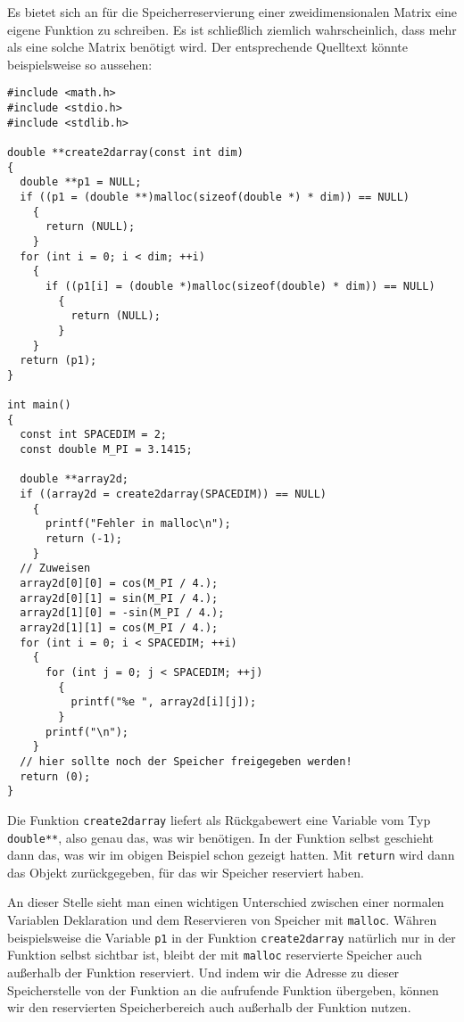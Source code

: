 Es bietet sich an für die Speicherreservierung einer zweidimensionalen Matrix eine eigene Funktion zu schreiben.
Es ist schließlich ziemlich wahrscheinlich, dass mehr als eine solche Matrix benötigt wird.
Der entsprechende Quelltext könnte beispielsweise so aussehen:
\begin{lstlisting}
#include <math.h>
#include <stdio.h>
#include <stdlib.h>

double **create2darray(const int dim)
{
  double **p1 = NULL;
  if ((p1 = (double **)malloc(sizeof(double *) * dim)) == NULL)
    {
      return (NULL);
    }
  for (int i = 0; i < dim; ++i)
    {
      if ((p1[i] = (double *)malloc(sizeof(double) * dim)) == NULL)
        {
          return (NULL);
        }
    }
  return (p1);
}

int main()
{
  const int SPACEDIM = 2;
  const double M_PI = 3.1415;

  double **array2d;
  if ((array2d = create2darray(SPACEDIM)) == NULL)
    {
      printf("Fehler in malloc\n");
      return (-1);
    }
  // Zuweisen
  array2d[0][0] = cos(M_PI / 4.);
  array2d[0][1] = sin(M_PI / 4.);
  array2d[1][0] = -sin(M_PI / 4.);
  array2d[1][1] = cos(M_PI / 4.);
  for (int i = 0; i < SPACEDIM; ++i)
    {
      for (int j = 0; j < SPACEDIM; ++j)
        {
          printf("%e ", array2d[i][j]);
        }
      printf("\n");
    }
  // hier sollte noch der Speicher freigegeben werden!
  return (0);
}
\end{lstlisting}
Die Funktion \verb|create2darray| liefert als Rückgabewert eine Variable vom Typ \verb|double**|, also genau das, was wir benötigen.
In der Funktion selbst geschieht dann das, was wir im obigen Beispiel schon gezeigt hatten.
Mit \verb|return| wird dann das Objekt zurückgegeben, für das wir Speicher reserviert haben.

An dieser Stelle sieht man einen wichtigen Unterschied zwischen einer normalen Variablen Deklaration und dem Reservieren von Speicher mit \verb|malloc|.
Währen beispielsweise die Variable \verb|p1| in der Funktion \verb|create2darray| natürlich nur in der Funktion selbst sichtbar ist, bleibt der mit \verb|malloc| reservierte Speicher auch außerhalb der Funktion reserviert.
Und indem wir die Adresse zu dieser Speicherstelle von der Funktion an die aufrufende Funktion übergeben, können wir den reservierten Speicherbereich auch außerhalb der Funktion nutzen.

